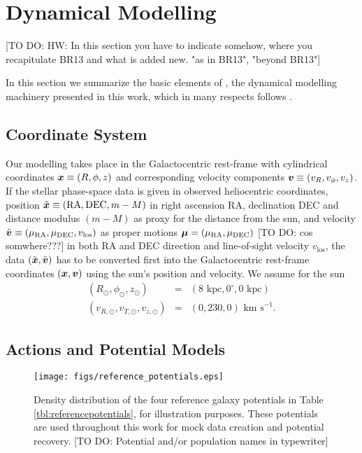 \section{Dynamical Modelling}

[TO DO: HW: In this section you have to indicate somehow, where you recapitulate BR13 and what is added new. "as in BR13", "beyond BR13"]

In this section we summarize the basic elements of \RM{}, the dynamical modelling machinery presented in this work, which in many respects follows \citet{bov13}.

\subsection{Coordinate System} \label{sec:coordinates}

Our modelling takes place in the Galactocentric rest-frame with cylindrical coordinates $\boldsymbol{x} \equiv (R,\phi,z)$ and corresponding velocity components $\boldsymbol{v} \equiv (v_R,v_\phi,v_z)$. If the stellar phase-space data is given in observed heliocentric coordinates, position $\tilde{\boldsymbol{x}} \equiv(\text{RA},\text{DEC},m-M)$ in right ascension RA, declination DEC and distance modulus $(m-M)$ as proxy for the distance from the sun, and velocity $\tilde{\boldsymbol{v}} \equiv (\mu_\text{RA},\mu_\text{DEC},v_\text{los})$ as proper motions $\boldsymbol{\mu}=(\mu_\text{RA},\mu_\text{DEC})$ [TO DO: cos somwhere???] in both RA and DEC direction and line-of-sight velocity $v_\text{los}$, the data $(\tilde{\boldsymbol{x}},\tilde{\boldsymbol{v}})$ has to be converted first into the Galactocentric rest-frame coordinates $(\boldsymbol{x},\boldsymbol{v})$ using the sun's position and velocity. We assume for the sun
\begin{eqnarray*}
(R_\odot,\phi_\odot,z_\odot) &=&(8 \text{ kpc}, 0^\circ, 0 \text{ kpc})\\
(v_{R,\odot},v_{T,\odot},v_{z,\odot}) &=& (0,230,0) \text{ km s}^{-1}.
\end{eqnarray*}

\subsection{Actions and Potential Models}  \label{sec:potentials}



\begin{figure*}
\texttt{[image: figs/reference\_potentials.eps]}
\caption{Density distribution of the four reference galaxy potentials in Table \ref{tbl:referencepotentials}, for illustration purposes. These potentials are used throughout this work for mock data creation and potential recovery. [TO DO: Potential and/or population names in typewriter]}
\label{fig:ref_pots}
\end{figure*}

